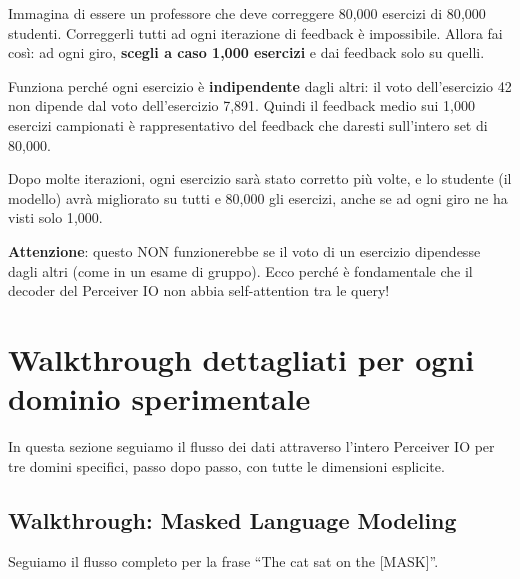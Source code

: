 \documentclass[12pt,a4paper]{article}
\begin{document}
\begin{notabox}
Immagina di essere un professore che deve correggere 80{,}000 esercizi di 80{,}000 studenti. Correggerli tutti ad ogni iterazione di feedback \`e impossibile. Allora fai cos\`i: ad ogni giro, \textbf{scegli a caso 1{,}000 esercizi} e dai feedback solo su quelli.

Funziona perch\'e ogni esercizio \`e \textbf{indipendente} dagli altri: il voto dell'esercizio 42 non dipende dal voto dell'esercizio 7{,}891. Quindi il feedback medio sui 1{,}000 esercizi campionati \`e rappresentativo del feedback che daresti sull'intero set di 80{,}000.

Dopo molte iterazioni, ogni esercizio sar\`a stato corretto pi\`u volte, e lo studente (il modello) avr\`a migliorato su tutti e 80{,}000 gli esercizi, anche se ad ogni giro ne ha visti solo 1{,}000.

\textbf{Attenzione}: questo NON funzionerebbe se il voto di un esercizio dipendesse dagli altri (come in un esame di gruppo). Ecco perch\'e \`e fondamentale che il decoder del Perceiver IO non abbia self-attention tra le query!
\end{notabox}


\section{Walkthrough dettagliati per ogni dominio sperimentale}

In questa sezione seguiamo il flusso dei dati attraverso l'intero Perceiver IO per tre domini specifici, passo dopo passo, con tutte le dimensioni esplicite.

\subsection{Walkthrough: Masked Language Modeling}

Seguiamo il flusso completo per la frase ``The cat sat on the [MASK]''.
\end{document}
